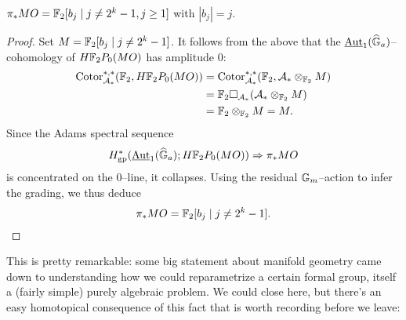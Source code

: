 \begin{corollary}
$\pi_* MO = \mathbb F_2[b_j \mid j \ne 2^k - 1, j \ge 1]$ with $|b_j| = j$.
\end{corollary}
\begin{proof}
Set $M = \mathbb F_2[b_j \mid j \ne 2^k - 1]$.   It follows from the above that the $\operatorname{\underline{\smash{\operatorname{Aut}}}}_1(\widehat{\mathbb G}_a)$--cohomology of $H\mathbb F_2P_0(MO)$ has amplitude $0$:
\begin{align*}
\operatorname{Cotor}_{\mathcal A_*}^{*, *}(\mathbb F_2, H\mathbb F_2P_0(MO)) & = \operatorname{Cotor}_{\mathcal A_*}^{*, *}(\mathbb F_2, \mathcal A_* \otimes_{\mathbb F_2} M) \\
& = \mathbb F_2 \square_{\mathcal A_*} (\mathcal A_* \otimes_{\mathbb F_2} M) \\
& = \mathbb F_2 \otimes_{\mathbb F_2} M = M.
\end{align*}
Since the Adams spectral sequence \[H^*_{\mathrm{gp}}(\operatorname{\underline{\smash{\operatorname{Aut}}}}_1(\widehat{\mathbb G}_a); H\mathbb F_2P_0(MO)) \Rightarrow \pi_* MO\] is concentrated on the $0$--line, it collapses.  Using the residual $\mathbb G_m$--action to infer the grading, we thus deduce \[\pi_* MO = \F_2[b_j \mid j \ne 2^k-1]. \qed\]
\end{proof}

This is pretty remarkable: some big statement about manifold geometry came down to understanding how we could reparametrize a certain formal group, itself a (fairly simple) purely algebraic problem.  We could close here, but there's an easy homotopical consequence of this fact that is worth recording before we leave:

